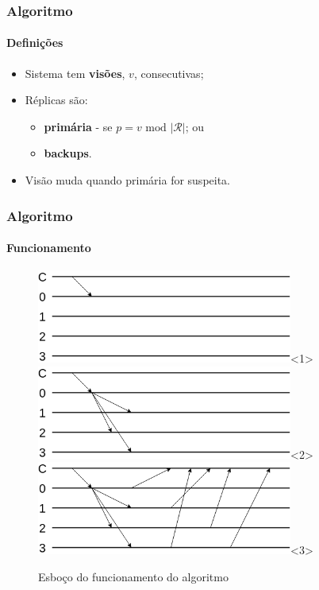 \documentclass{beamer}
\begin{document}
\begin{frame}
  \frametitle{Algoritmo}
  \framesubtitle{Definições}

  \begin{itemize}
    \item
      Sistema tem \textbf{visões}, $v$, consecutivas;

    \item
      Réplicas são:
      \begin{itemize}
        \item
          \textbf{primária} - se $p = v \text{ mod } |\mathcal{R}|$; ou
          
        \item
          \textbf{backups}.
      \end{itemize}

    \item
      Visão muda quando primária for suspeita.
  \end{itemize}
\end{frame}

\begin{frame}
  \frametitle{Algoritmo}
  \framesubtitle{Funcionamento}

  \begin{figure}
    \includegraphics[width=0.75\textwidth]{images/algo01}<1>
    \includegraphics[width=0.75\textwidth]{images/algo02}<2>
    \includegraphics[width=0.75\textwidth]{images/algo03}<3>
    \caption{Esboço do funcionamento do algoritmo}
  \end{figure}
\end{frame}
\end{document}
